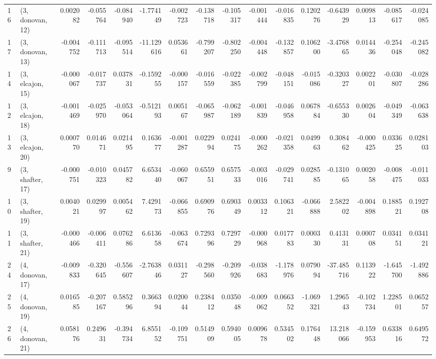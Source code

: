 \begin{tabular}{llrrrrrrrrrrrrrr}
16 &  (3, donovan, 12) &   0.002082 & -0.055764 & -0.084940 &  -1.774149 & -0.002723 &  -0.138718 & -0.105317 & -0.001444 & -0.016835 &  0.120276 &  -0.643929 &  0.009813 & -0.085617 & -0.024085 \\
17 &  (3, donovan, 13) &  -0.004752 & -0.111713 & -0.095514 & -11.129616 &  0.053661 &  -0.799207 & -0.802250 & -0.004448 & -0.132857 &  0.106200 &  -3.476865 &  0.014436 & -0.254048 & -0.245082 \\
14 &  (3, elcajon, 15) &  -0.000067 & -0.017737 &  0.037831 &  -0.159255 & -0.000157 &  -0.016559 & -0.022385 & -0.002799 & -0.048151 & -0.015086 &  -0.320327 &  0.002201 & -0.030807 & -0.028286 \\
12 &  (3, elcajon, 18) &  -0.001469 & -0.025970 & -0.053064 &  -0.512193 &  0.005167 &  -0.065987 & -0.062189 & -0.001839 & -0.046958 &  0.067884 &  -0.655330 &  0.002604 & -0.049349 & -0.063638 \\
13 &  (3, elcajon, 20) &   0.000770 &  0.014671 &  0.021495 &   0.163677 & -0.001287 &   0.022994 &  0.024175 & -0.000262 & -0.021358 &  0.049963 &   0.308462 & -0.000425 &  0.033625 &  0.028103 \\
9  &  (3, shafter, 17) &  -0.000751 & -0.010323 &  0.045782 &   6.653440 & -0.060067 &   0.655951 &  0.657533 & -0.003016 & -0.029741 &  0.028585 &  -0.131065 &  0.002058 & -0.008475 & -0.011033 \\
10 &  (3, shafter, 19) &   0.004021 &  0.029997 &  0.005462 &   7.429173 & -0.066855 &   0.690976 &  0.690349 &  0.003312 &  0.106321 & -0.066888 &   2.582202 & -0.004898 &  0.188521 &  0.192708 \\
11 &  (3, shafter, 21) &  -0.000466 & -0.006411 &  0.076286 &   6.613658 & -0.063674 &   0.729396 &  0.729729 & -0.000968 &  0.017783 &  0.000330 &   0.413131 &  0.000708 &  0.034151 &  0.034121 \\
24 &  (4, donovan, 17) &  -0.009833 & -0.320645 & -0.556607 &  -2.763846 &  0.031127 &  -0.298560 & -0.209926 & -0.038683 & -1.178976 &  0.079094 & -37.485716 &  0.113922 & -1.645700 & -1.492886 \\
25 &  (4, donovan, 19) &   0.016585 & -0.207167 &  0.585296 &   0.366394 &  0.020044 &   0.238412 &  0.035048 & -0.009062 &  0.066352 & -1.069321 &   1.296543 & -0.102734 &  1.228501 &  0.065257 \\
26 &  (4, donovan, 21) &   0.058176 &  0.249631 & -0.394734 &   6.855152 & -0.109751 &   0.514909 &  0.594005 &  0.009678 &  0.534502 &  0.176448 &  13.218066 & -0.159953 &  0.633816 &  0.649572 \\

\end{tabular}
